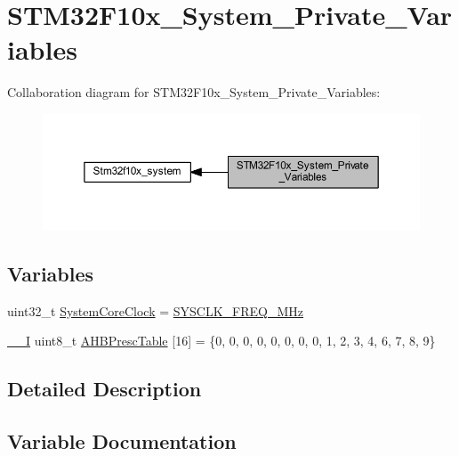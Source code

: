 \hypertarget{group___s_t_m32_f10x___system___private___variables}{}\section{S\+T\+M32\+F10x\+\_\+\+System\+\_\+\+Private\+\_\+\+Variables}
\label{group___s_t_m32_f10x___system___private___variables}
Collaboration diagram for S\+T\+M32\+F10x\+\_\+\+System\+\_\+\+Private\+\_\+\+Variables\+:
\nopagebreak
\begin{figure}[H]
\begin{center}
\leavevmode
\includegraphics[width=350pt]{group___s_t_m32_f10x___system___private___variables}
\end{center}
\end{figure}
\subsection*{Variables}
\begin{DoxyCompactItemize}
\item 
uint32\+\_\+t \hyperlink{group___s_t_m32_f10x___system___private___variables_gaa3cd3e43291e81e795d642b79b6088e6}{System\+Core\+Clock} = \hyperlink{group___s_t_m32_f10x___system___private___defines_ga69649cc38f34627cfb48b51062ebd390}{S\+Y\+S\+C\+L\+K\+\_\+\+F\+R\+E\+Q\+\_\+M\+Hz}
\item 
\hyperlink{core__sc300_8h_af63697ed9952cc71e1225efe205f6cd3}{\+\_\+\+\_\+I} uint8\+\_\+t \hyperlink{group___s_t_m32_f10x___system___private___variables_gacdc3ef54c0704c90e69a8a84fb2d970d}{A\+H\+B\+Presc\+Table} \mbox{[}16\mbox{]} = \{0, 0, 0, 0, 0, 0, 0, 0, 1, 2, 3, 4, 6, 7, 8, 9\}
\end{DoxyCompactItemize}


\subsection{Detailed Description}


\subsection{Variable Documentation}
\mbox{\label{group___s_t_m32_f10x___system___private___variables_gacdc3ef54c0704c90e69a8a84fb2d970d}} 
